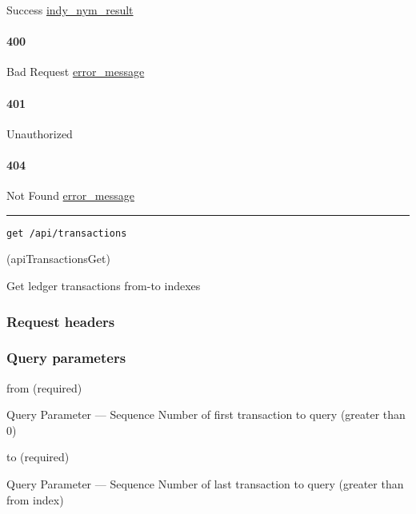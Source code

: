 Success \protect\hyperlink{indy_nym_result}{indy\_nym\_result}

\hypertarget{section-472}{%
\paragraph{400}\label{section-472}}

Bad Request \protect\hyperlink{error_message}{error\_message}

\hypertarget{section-473}{%
\paragraph{401}\label{section-473}}

Unauthorized \protect\hyperlink{}{}

\hypertarget{section-474}{%
\paragraph{404}\label{section-474}}

Not Found \protect\hyperlink{error_message}{error\_message}

\begin{center}\rule{0.5\linewidth}{\linethickness}\end{center}

\protect\hypertarget{apiTransactionsGet}{}{}

\begin{verbatim}
get /api/transactions
\end{verbatim}

({apiTransactionsGet})

Get ledger transactions from-to indexes

\hypertarget{request-headers-79}{%
\subsubsection{Request headers}\label{request-headers-79}}

\hypertarget{query-parameters-6}{%
\subsubsection{Query parameters}\label{query-parameters-6}}

from (required)

{Query Parameter} --- Sequence Number of first transaction to query
(greater than 0)

to (required)

{Query Parameter} --- Sequence Number of last transaction to query
(greater than from index)

